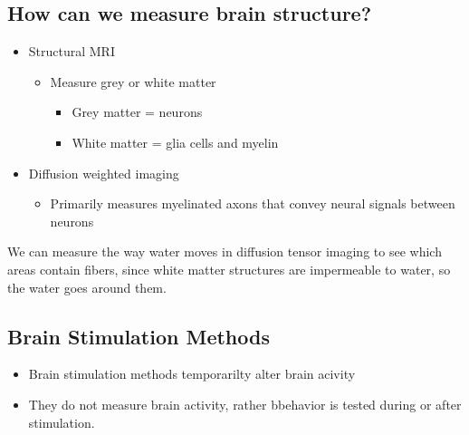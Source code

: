 \subsection{How can we measure brain structure?}
\begin{itemize}
    \item Structural MRI
    \begin{itemize}
        \item Measure grey or white matter
        \begin{itemize}
            \item Grey matter = neurons
            \item White matter = glia cells and myelin
            
        \end{itemize}
    \end{itemize}
    \item Diffusion weighted imaging
    \begin{itemize}
        \item Primarily measures myelinated axons that convey neural signals between neurons
    \end{itemize}
\end{itemize}
We can measure the way water moves in diffusion tensor imaging to see which areas contain fibers, since white matter structures are impermeable to water, so the water goes around them.

\subsection{Brain Stimulation Methods}
\begin{itemize}
    \item Brain stimulation methods temporarilty alter brain acivity
    \item They do not measure brain activity, rather bbehavior is tested during or after stimulation.
\end{itemize}

